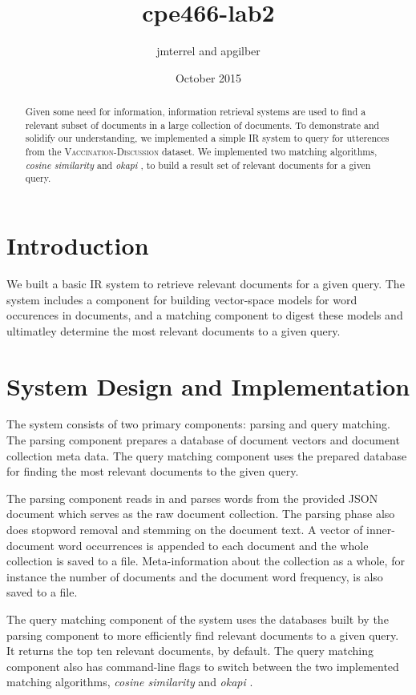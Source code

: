\documentclass{report}
\title{cpe466-lab2}
\author{jmterrel and apgilber}
\date{October 2015}
\newcommand{\okapi}{\textit{okapi} }
\newcommand{\cosine}{\textit{cosine similarity} }
\begin{document}
\maketitle

\begin{abstract}
Given some need for information, information retrieval systems are
used to find a relevant subset of documents in a large collection of
documents. To demonstrate and solidify our understanding, we
implemented a simple IR system to query for utterences from the
\textsc{Vaccination-Discussion} dataset. We implemented two matching
algorithms, \cosine and \okapi, to build a
result set of relevant documents for a given query.
\end{abstract}

\section{Introduction}
We built a basic IR system to retrieve relevant documents for a given
query. The system includes a component for building vector-space
models for word occurences in documents, and a matching component to
digest these models and ultimatley determine the most relevant
documents to a given query.

\section{System Design and Implementation}
The system consists of two primary components: parsing and query
matching. The parsing component prepares a database of document
vectors and document collection meta data. The query matching
component uses the prepared database for finding the most relevant
documents to the given query.

The parsing component reads in and parses words from the provided JSON
document which serves as the raw document collection. The parsing
phase also does stopword removal and stemming on the document text. A
vector of inner-document word occurrences is appended to each document
and the whole collection is saved to a file. Meta-information
about the collection as a whole, for instance the number of documents
and the document word frequency, is also saved to a file.

The query matching component of the system uses the databases built by
the parsing component to more efficiently find relevant documents to a
given query. It returns the top ten relevant documents, by
default. The query matching component also has command-line flags to
switch between the two implemented matching algorithms, \cosine and
\okapi.
\end{document}
